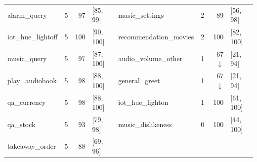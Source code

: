 \begin{tabular}{lrrl|lrrl}
alarm\_query & 5 & 97 & [85, 99] & music\_settings & 2 & 89 & [56, 98] \\
iot\_hue\_lightoff & 5 & 100 & [90, 100] & recommendation\_movies & 2 & 100 & [82, 100] \\
music\_query & 5 & 97 & [87, 100] & audio\_volume\_other & 1 & 67$\downarrow$ & [21, 94] \\
play\_audiobook & 5 & 98 & [88, 100] & general\_greet & 1 & 67$\downarrow$ & [21, 94] \\
qa\_currency & 5 & 98 & [88, 100] & iot\_hue\_lighton & 1 & 100 & [61, 100] \\
qa\_stock & 5 & 93 & [79, 98] & music\_dislikeness & 0 & 100 & [44, 100] \\
takeaway\_order & 5 & 88 & [69, 96] & & & & \\
\bottomrule
\end{tabular}

